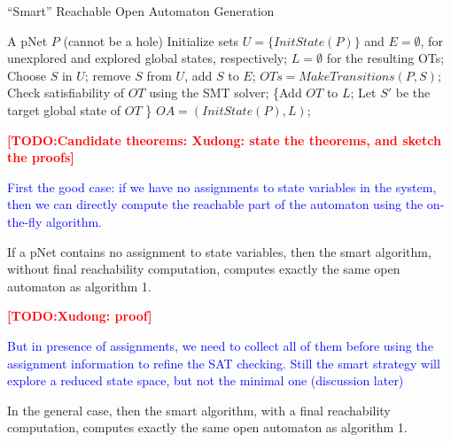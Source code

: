 \documentclass[smallcondensed]{svjour3}
\newcommand{\TODO}[1]{\textcolor{red}{\textbf{[TODO:#1]}}}
\newcommand{\ERIC}[1]{\textcolor{blue}{#1}}
\begin{document}
\begin{algorithm}[h]
  \caption{``Smart'' Reachable Open Automaton Generation}
  \label{alg3}
\begin{algorithmic}[1]
\Require A pNet $P$ (cannot be a hole)
\State Initialize sets $U=\{\mathit{InitState}(P)\}$ and $E=\emptyset$,
for unexplored and explored global states, respectively; $L=\emptyset$ for the resulting OTs;
	\State Choose $S$ in $U$; remove $S$ from $U$, add $S$ to $E$;
	\State $\mathit{OTs} = \mathit{MakeTransitions}(P, S)$;
        Check satisfiability of $\mathit{OT}$ using the SMT solver;
                {\State \{Add $\mathit{OT}$ to $L$;
                  \State Let $S'$ be the target global state of $\mathit{OT}$
                  \}}
	\EndFor
\EndWhile
\State \Return $\mathit{OA}=(\mathit{InitState}(P),L)$;

\end{algorithmic}  
\end{algorithm}

\TODO{Candidate theorems: Xudong: state the theorems, and sketch the proofs}

\ERIC{First the good case: if we have no assignments to state variables in
the system, then we can directly compute the reachable part of the
automaton using the on-the-fly algorithm.}

\begin{theorem}
  \label{Th:finiteness}
If a pNet contains no assignment to state variables, then the smart
algorithm, without final reachability computation, computes exactly
the same open automaton as algorithm 1.
  \end{theorem}

\TODO{Xudong: proof}

\ERIC{But in presence of assignments, we need to collect all of them
  before using the assignment information to refine the SAT
  checking. Still the smart strategy will explore a reduced state
  space, but not the minimal one (discussion later)}
  
\begin{theorem}
  \label{Th:finiteness}
In the general case, then the smart
algorithm, with a final reachability computation, computes exactly
the same open automaton as algorithm 1.
\end{theorem}
\end{document}
